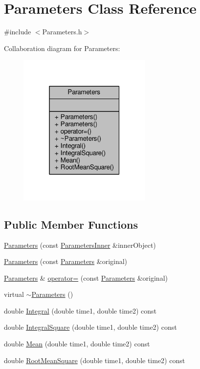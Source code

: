 \hypertarget{classParameters}{}\section{Parameters Class Reference}
\label{classParameters}


{\ttfamily \#include $<$Parameters.\+h$>$}



Collaboration diagram for Parameters\+:
\nopagebreak
\begin{figure}[H]
\begin{center}
\leavevmode
\includegraphics[width=187pt]{classParameters__coll__graph}
\end{center}
\end{figure}
\subsection*{Public Member Functions}
\begin{DoxyCompactItemize}
\item 
\hyperlink{classParameters_a82a97d8393103fecb5458fc2d98efbb4}{Parameters} (const \hyperlink{classParametersInner}{Parameters\+Inner} \&inner\+Object)
\item 
\hyperlink{classParameters_a6b26309ae0375b719bd2493a6fff7e81}{Parameters} (const \hyperlink{classParameters}{Parameters} \&original)
\item 
\hyperlink{classParameters}{Parameters} \& \hyperlink{classParameters_af3c89e86a74f3cd97b14c3a2e71d4b16}{operator=} (const \hyperlink{classParameters}{Parameters} \&original)
\item 
virtual \hyperlink{classParameters_ab63bff39f72bf70a634b8c943dd19136}{$\sim$\+Parameters} ()
\item 
double \hyperlink{classParameters_a11d8cbc54d33121ed02365be15568643}{Integral} (double time1, double time2) const
\item 
double \hyperlink{classParameters_a6bd34053b273fc591258ccbf4380d501}{Integral\+Square} (double time1, double time2) const
\item 
double \hyperlink{classParameters_a412ab75e26ede3b0ab54dc7df58074a6}{Mean} (double time1, double time2) const
\item 
double \hyperlink{classParameters_a51474994c078edab356d33c5d56504ab}{Root\+Mean\+Square} (double time1, double time2) const
\end{DoxyCompactItemize}


